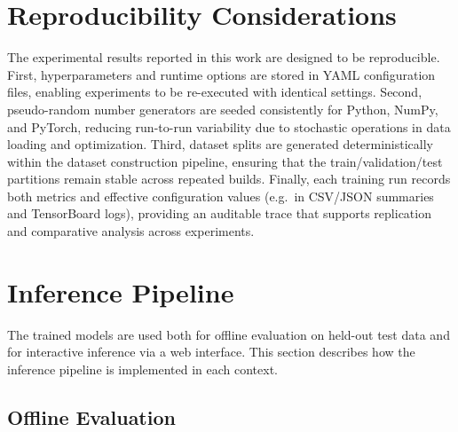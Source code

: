 \section{Reproducibility Considerations}
\label{sec:reproducibility}

The experimental results reported in this work are designed to be reproducible. First, hyperparameters and runtime options are stored in YAML configuration files, enabling experiments to be re-executed with identical settings. Second, pseudo-random number generators are seeded consistently for Python, NumPy, and PyTorch, reducing run-to-run variability due to stochastic operations in data loading and optimization. Third, dataset splits are generated deterministically within the dataset construction pipeline, ensuring that the train/validation/test partitions remain stable across repeated builds. Finally, each training run records both metrics and effective configuration values (e.g.\ in CSV/JSON summaries and TensorBoard logs), providing an auditable trace that supports replication and comparative analysis across experiments.

\section{Inference Pipeline}
\label{sec:inference}

The trained models are used both for offline evaluation on held-out test data and for interactive inference via a web interface. This section describes how the inference pipeline is implemented in each context.

\subsection{Offline Evaluation}

